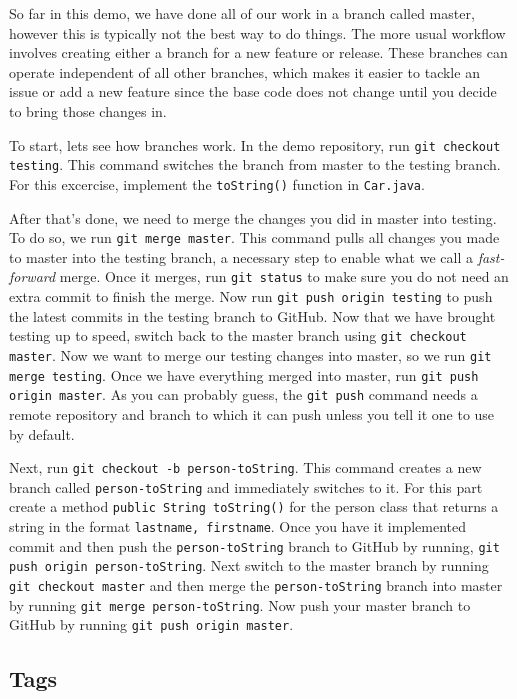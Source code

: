 \documentclass[notitlepage]{simple}
\begin{document}
So far in this demo, we have done all of our work in a branch called master, however this is typically not the best way to do things.
The more usual workflow involves creating either a branch for a new feature or release.
These branches can operate independent of all other branches, which makes it easier to tackle an issue or add a new feature since the base code does not change until you decide to bring those changes in.

To start, lets see how branches work.
In the demo repository, run \verb|git checkout testing|.
This command switches the branch from master to the testing branch.
For this excercise, implement the \verb|toString()| function in \verb|Car.java|.

After that's done, we need to merge the changes you did in master into testing.
To do so, we run \verb|git merge master|.
This command pulls all changes you made to master into the testing branch, a necessary step to enable what we call a \textit{fast-forward} merge.
Once it merges, run \verb|git status| to make sure you do not need an extra commit to finish the merge.
Now run \verb|git push origin testing| to push the latest commits in the testing branch to GitHub.
Now that we have brought testing up to speed, switch back to the master branch using \verb|git checkout master|.
Now we want to merge our testing changes into master, so we run \verb|git merge testing|.
Once we have everything merged into master, run \verb|git push origin master|.
As you can probably guess, the \verb|git push| command needs a remote repository and branch to which it can push unless you tell it one to use by default.

Next, run \verb|git checkout -b person-toString|.
This command creates a new branch called
\linebreak\verb|person-toString| and immediately switches to it.
For this part create a method \verb|public String toString()| for the person class that returns a string in the format \verb|lastname, firstname|.
Once you have it implemented commit and then push the \verb|person-toString| branch to GitHub by running,
\linebreak\verb|git push origin person-toString|.
Next switch to the master branch by running \verb|git checkout master| and then merge the \verb|person-toString| branch into master by running \verb|git merge person-toString|.
Now push your master branch to GitHub by running \verb|git push origin master|.

\subsection{Tags}
\end{document}
